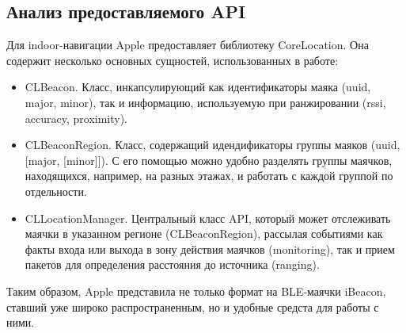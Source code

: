 \subsection{Анализ предоставляемого API}

Для indoor-навигации Apple предоставляет библиотеку CoreLocation. Она содержит несколько основных сущностей, использованных в работе:

\begin{itemize}
    \item
    CLBeacon. Класс, инкапсулирующий как идентификаторы маяка (uuid, major, minor), так и информацию, используемую при ранжировании (rssi, accuracy, proximity).
    \item
    CLBeaconRegion. Класс, содержащий идендификаторы группы маяков (uuid, [major, [minor]]). С его помощью можно удобно разделять группы маячков, находящихся, например, на разных этажах, и работать с каждой группой по отдельности.
    \item
    CLLocationManager. Центральный класс API, который может отслеживать маячки в указанном регионе (CLBeaconRegion), рассылая событиями как факты входа или выхода в зону действия маячков (monitoring), так и прием пакетов для определения расстояния до источника (ranging).
\end{itemize}

Таким образом, Apple представила не только формат на BLE-маячки iBeacon, ставший уже широко распространенным, но и удобные средста для работы с ними.